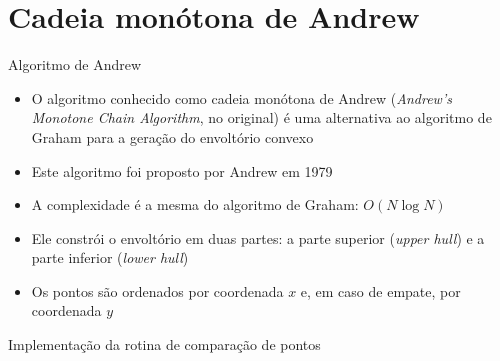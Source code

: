 \section{Cadeia monótona de Andrew}

\begin{frame}[fragile]{Algoritmo de Andrew}

    \begin{itemize}
        \item O algoritmo conhecido como cadeia monótona de Andrew (\textit{Andrew's Monotone
            Chain Algorithm}, no original) é uma alternativa ao algoritmo de Graham para a
            geração do envoltório convexo

        \item Este algoritmo foi proposto por Andrew em 1979

        \item A complexidade é a mesma do algoritmo de Graham: $O(N\log N)$

        \item Ele constrói o envoltório em duas partes: a parte superior (\textit{upper hull})
            e a parte inferior (\textit{lower hull})

        \item Os pontos são ordenados por coordenada $x$ e, em caso de empate, por coordenada $y$
    \end{itemize}

\end{frame}



\begin{frame}[fragile]{Implementação da rotina de comparação de pontos}
\end{frame}


